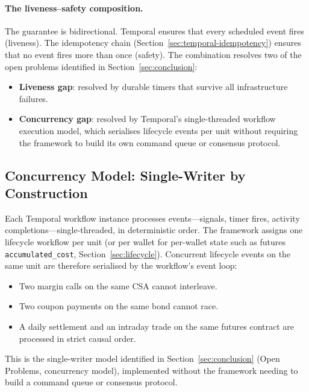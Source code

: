 \documentclass[11pt,a4paper]{article}
\begin{document}
\paragraph{The liveness--safety composition.}
The guarantee is bidirectional. Temporal ensures that every scheduled event fires (liveness). The idempotency chain (Section~\ref{sec:temporal-idempotency}) ensures that no event fires more than once (safety). The combination resolves two of the open problems identified in Section~\ref{sec:conclusion}:

\begin{itemize}[nosep]
\item \textbf{Liveness gap}: resolved by durable timers that survive all infrastructure failures.
\item \textbf{Concurrency gap}: resolved by Temporal's single-threaded workflow execution model, which serialises lifecycle events per unit without requiring the framework to build its own command queue or consensus protocol.
\end{itemize}

\subsection{Concurrency Model: Single-Writer by Construction}
\label{sec:temporal-concurrency}

Each Temporal workflow instance processes events---signals, timer fires, activity completions---single-threaded, in deterministic order. The framework assigns one lifecycle workflow per unit (or per wallet for per-wallet state such as futures \texttt{accumulated\_cost}, Section~\ref{sec:lifecycle}). Concurrent lifecycle events on the same unit are therefore serialised by the workflow's event loop:

\begin{itemize}[nosep]
\item Two margin calls on the same CSA cannot interleave.
\item Two coupon payments on the same bond cannot race.
\item A daily settlement and an intraday trade on the same futures contract are processed in strict causal order.
\end{itemize}

\noindent This is the single-writer model identified in Section~\ref{sec:conclusion} (Open Problems, concurrency model), implemented without the framework needing to build a command queue or consensus protocol.
\end{document}
